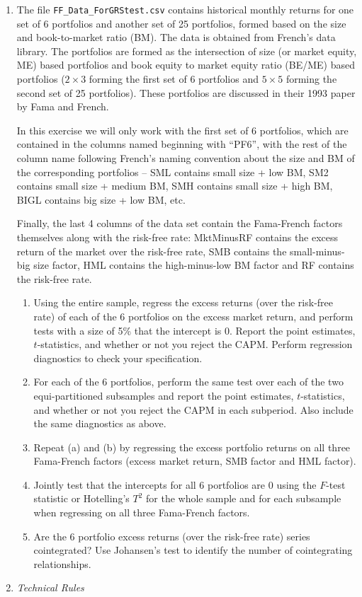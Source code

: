 \documentclass[12pt]{article}
\begin{document}
\begin{enumerate}
\item The file {\tt FF\_Data\_ForGRStest.csv} contains historical monthly returns for one set of 6 portfolios and another set of 25 portfolios, formed based on the size and book-to-market ratio (BM). The data is obtained from French's data library. The portfolios are formed as the intersection of size (or market equity, ME) based portfolios and book equity to market equity ratio (BE/ME) based portfolios ($2\times 3$ forming the first set of 6 portfolios and $5\times 5$ forming the second set of 25 portfolios). These portfolios are discussed in their 1993 paper by Fama and French.

In this exercise we will only work with the first set of 6 portfolios, which are contained in the columns named beginning with ``PF6'', with the rest of the column name following French's naming convention about the size and BM of the corresponding portfolios -- SML contains small size + low BM, SM2 contains small size + medium BM, SMH contains small size + high BM, BIGL contains big size + low BM, etc.

Finally, the last 4 columns of the data set contain the Fama-French factors themselves along with the risk-free rate: MktMinusRF contains the excess return of the market over the risk-free rate, SMB contains the small-minus-big size factor, HML contains the high-minus-low BM factor and RF contains the risk-free rate.

\begin{enumerate}
\item Using the entire sample, regress the excess returns (over the risk-free rate) of each of the 6 portfolios on the excess market return, and perform tests with a size of 5\% that the intercept is 0. Report the point estimates, $t$-statistics, and whether or not you reject the CAPM. Perform regression diagnostics to check your specification.
\item For each of the 6 portfolios, perform the same test over each of the two equi-partitioned subsamples and report the point estimates, $t$-statistics, and whether or not you reject the CAPM in each subperiod. Also include the same diagnostics as above.
\item Repeat (a) and (b) by regressing the excess portfolio returns on all three Fama-French factors (excess market return, SMB factor and HML factor).
\item Jointly test that the intercepts for all 6 portfolios are 0 using the $F$-test statistic or Hotelling's $T^2$ for the whole sample and for each subsample when regressing on all three Fama-French factors.
\item Are the 6 portfolio excess returns (over the risk-free rate) series cointegrated? Use Johansen's test to identify the number of cointegrating relationships.
\end{enumerate}
\item{\it Technical Rules}


\end{enumerate}
\end{document}
